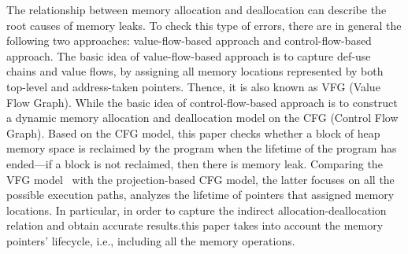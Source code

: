The relationship between memory allocation and deallocation can describe the root causes of memory leaks. 
To check this type of errors, there are in general the following two approaches: value-flow-based approach and control-flow-based approach. The basic idea of value-flow-based approach is to capture def-use chains and value flows, by assigning all memory locations represented by both top-level and address-taken pointers. Thence, it is also known as VFG (Value Flow Graph). While the basic idea of control-flow-based approach is to construct a dynamic memory allocation and deallocation model on the CFG (Control Flow Graph). Based on the CFG model, this paper checks whether a block of heap memory space is reclaimed by the program when the lifetime of the program has ended---if a block is not reclaimed, then there is memory leak. Comparing the VFG model~\cite{SYX12} with the projection-based CFG model, the latter focuses on all the possible execution paths, analyzes the lifetime of pointers that assigned memory locations. %
In particular, in order to capture the indirect allocation-deallocation relation and obtain accurate results.this paper takes into account the memory pointers' lifecycle, i.e., including all the memory operations.
 

